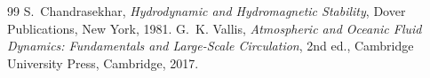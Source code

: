 \documentclass[10pt,a4paper]{amsart}
\begin{document}
\begin{thebibliography}{99}
 S.~Chandrasekhar, \textit{Hydrodynamic and Hydromagnetic Stability}, Dover Publications, New York, 1981.
 G.~K. Vallis, \textit{Atmospheric and Oceanic Fluid Dynamics: Fundamentals and Large-Scale Circulation}, 2nd ed., Cambridge University Press, Cambridge, 2017.
\end{thebibliography}
\end{document}
